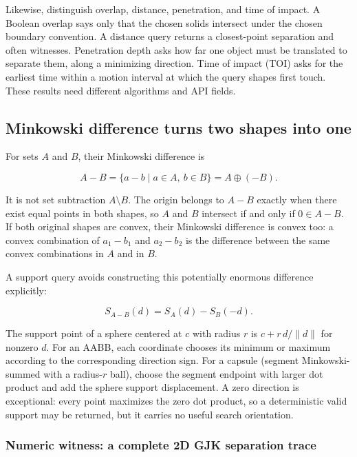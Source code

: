 Likewise, distinguish overlap, distance, penetration, and time of impact. A Boolean overlap says only that the chosen solids intersect under the chosen boundary convention. A distance query returns a closest-point separation and often witnesses. Penetration depth asks how far one object must be translated to separate them, along a minimizing direction. Time of impact (TOI) asks for the earliest time within a motion interval at which the query shapes first touch. These results need different algorithms and API fields.

\subsection{Minkowski difference turns two shapes into one}\label{03-visual-computing-i-ch020-minkowski-difference-turns-two-shapes-into-one}

For sets \(A\) and \(B\), their Minkowski difference is

\[
A-B=\{a-b\mid a\in A,\ b\in B\}=A\oplus(-B).
\]

It is not set subtraction \(A\setminus B\). The origin belongs to \(A-B\) exactly when there exist equal points in both shapes, so \(A\) and \(B\) intersect if and only if \(0\in A-B\). If both original shapes are convex, their Minkowski difference is convex too: a convex combination of \(a_1-b_1\) and \(a_2-b_2\) is the difference between the same convex combinations in \(A\) and in \(B\).

A support query avoids constructing this potentially enormous difference explicitly:

\[
S_{A-B}(d)=S_A(d)-S_B(-d).
\]

The support point of a sphere centered at \(c\) with radius \(r\) is \(c+r\,d/\|d\|\) for nonzero \(d\). For an AABB, each coordinate chooses its minimum or maximum according to the corresponding direction sign. For a capsule (segment Minkowski-summed with a radius-\(r\) ball), choose the segment endpoint with larger dot product and add the sphere support displacement. A zero direction is exceptional: every point maximizes the zero dot product, so a deterministic valid support may be returned, but it carries no useful search orientation.

\subsubsection{Numeric witness: a complete 2D GJK separation trace}\label{03-visual-computing-i-ch020-numeric-witness-a-complete-2d-gjk-separation-trace}

